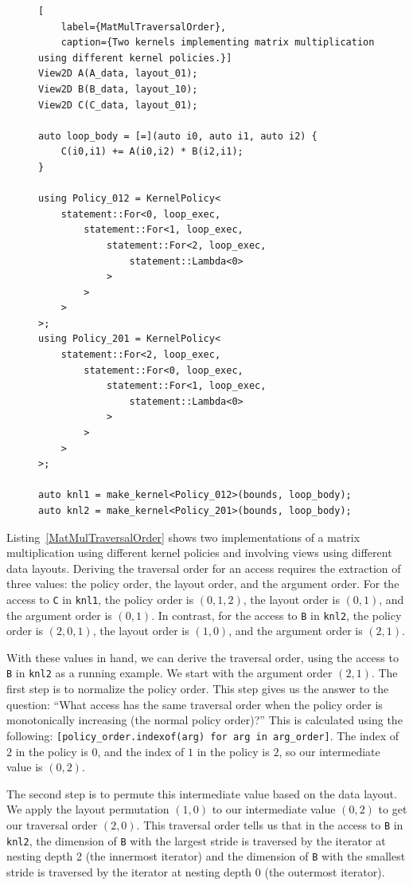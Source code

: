 \documentclass[sigconf, table]{acmart}
\begin{document}
\begin{figure}
\begin{lstlisting}[
	label={MatMulTraversalOrder}, 
	caption={Two kernels implementing matrix multiplication using different kernel policies.}]
View2D A(A_data, layout_01);
View2D B(B_data, layout_10);
View2D C(C_data, layout_01);

auto loop_body = [=](auto i0, auto i1, auto i2) {
	C(i0,i1) += A(i0,i2) * B(i2,i1);
}

using Policy_012 = KernelPolicy<
	statement::For<0, loop_exec,
    	statement::For<1, loop_exec,
	  		statement::For<2, loop_exec,
			  	statement::Lambda<0>
	  		>
		>
  	>
>;
using Policy_201 = KernelPolicy<
	statement::For<2, loop_exec,
    	statement::For<0, loop_exec,
	  		statement::For<1, loop_exec,
			  	statement::Lambda<0>
	  		>
		>
  	>
>;

auto knl1 = make_kernel<Policy_012>(bounds, loop_body);
auto knl2 = make_kernel<Policy_201>(bounds, loop_body);
\end{lstlisting}
\end{figure}

Listing~\ref{MatMulTraversalOrder} shows two implementations of a matrix multiplication using different kernel policies and involving views using different data layouts.
Deriving the traversal order for an access requires the extraction of three values: the policy order, the layout order, and the argument order. 
For the access to \verb.C. in \verb.knl1., the policy order is $(0,1,2)$, the layout order is $(0,1)$, and the argument order is $(0,1)$. 
In contrast, for the access to \verb.B. in \verb.knl2., the policy order is $(2,0,1)$, the layout order is $(1,0)$, and the argument order is $(2,1)$. 

With these values in hand, we can derive the traversal order, using the access to \verb.B. in \verb.knl2. as a running example. 
We start with the argument order $(2,1)$.
The first step is to normalize the policy order.
This step gives us the answer to the question: \enquote{What access has the same traversal order when the policy order is monotonically increasing (the normal policy order)?}
This is calculated using the following: \verb,[policy_order.indexof(arg) for arg in arg_order],. 
The index of $2$ in the policy is $0$, and the index of $1$ in the policy is $2$, so our intermediate value is $(0,2)$. 

The second step is to permute this intermediate value based on the data layout. 
We apply the layout permutation $(1,0)$ to our intermediate value $(0,2)$ to get our traversal order $(2,0)$. 
This traversal order tells us that in the access to \verb.B. in \verb.knl2., the dimension of \verb.B. with the largest stride is traversed by the iterator at nesting depth 2 (the innermost iterator) and the dimension of \verb.B. with the smallest stride is traversed by the iterator at nesting depth 0 (the outermost iterator). 
\end{document}
